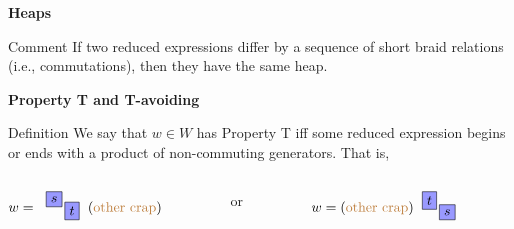 \documentclass[9pt,handout]{beamer}
\newcommand{\<}{\langle}
\renewcommand{\>}{\rangle}
\begin{document}
\begin{frame}{\textbf{Heaps}}
\pause

\begin{block}{Comment}
If two reduced expressions differ by a sequence of short braid relations (i.e., commutations), then they have the same heap.
\end{block}

\end{frame}


\begin{frame}{\textbf{Property T and T-avoiding}}\pause

\begin{block}{Definition}
We say that $w\in W$ has \alert{Property T} iff some reduced expression begins or ends with a product of non-commuting generators.  \pause That is,
\begin{columns}
\begin{column}{.4\linewidth}
\begin{center}
$w=\begin{tabular}{c}
\begin{tikzpicture}[scale=.3]
\node[draw, rectangle, fill=blue!40] at (0,5.5){$s$};
\node[draw, rectangle, fill=blue!40] at (1.5,4.5){$t$};
\end{tikzpicture}
\end{tabular}
({\color{brown}\text{other crap}})$
\end{center}
\end{column}

\begin{column}{.1\linewidth}
\begin{center}
or
\end{center}
\end{column}

\begin{column}{.4\linewidth}
\begin{center}
$w=({\color{brown}\text{other crap}})\begin{tabular}{c}
\begin{tikzpicture}[scale=.3]
\node[draw, rectangle, fill=blue!40] at (0,5.5){$t$};
\node[draw, rectangle, fill=blue!40] at (1.5,4.5){$s$};
\end{tikzpicture}
\end{tabular}$
\end{center}
\end{column}
\end{columns}
\end{block}


\end{frame}
\end{document}
